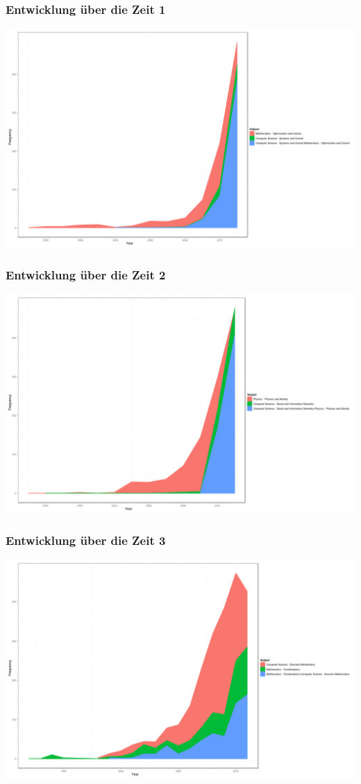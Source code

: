 \documentclass[12pt, xcolor=table]{beamer}
\begin{document}
\begin{frame}
	\frametitle{Entwicklung über die Zeit 1}
	\begin{center}
		\includegraphics[scale=0.4]{../../visual/trend/csmath.png}
	\end{center}
\end{frame}
\begin{frame}
	\frametitle{Entwicklung über die Zeit 2}
	\begin{center}
		\includegraphics[scale=0.4]{../../visual/trend/csph.png}
	\end{center}
\end{frame}
\begin{frame}
	\frametitle{Entwicklung über die Zeit 3}
	\begin{center}
		\includegraphics[scale=0.4]{../../visual/trend/combcs.png}
	\end{center}
\end{frame}
\end{document}
